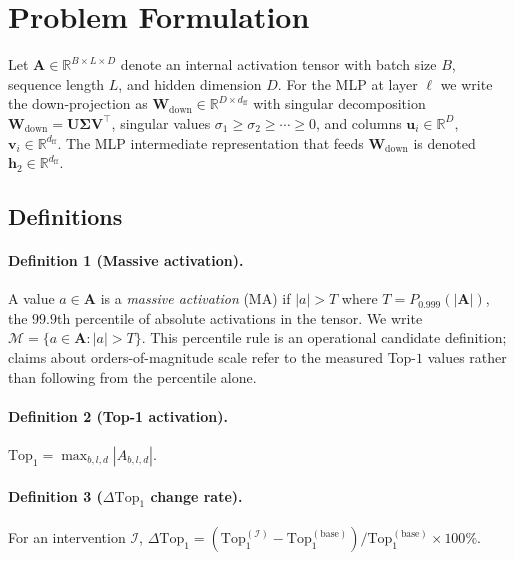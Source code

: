 \documentclass{article}
\newcommand{\Wdown}{\mathbf{W}_{\text{down}}}
\newcommand{\ffd}{d_{\text{ff}}}
\newcommand{\topk}{\mathrm{Top}}
\begin{document}
\section{Problem Formulation}
\label{sec:prelim}

Let $\mathbf{A} \in \mathbb{R}^{B \times L \times D}$ denote an internal
activation tensor with batch size $B$, sequence length $L$, and hidden
dimension $D$. For the MLP at layer $\ell$ we write the down-projection as
$\Wdown \in \mathbb{R}^{D \times \ffd}$ with singular decomposition
$\Wdown = \mathbf{U}\boldsymbol{\Sigma}\mathbf{V}^{\top}$, singular values
$\sigma_1 \geq \sigma_2 \geq \cdots \geq 0$, and columns
$\mathbf{u}_i \in \mathbb{R}^D$, $\mathbf{v}_i \in \mathbb{R}^{\ffd}$. The
MLP intermediate representation that feeds $\Wdown$ is denoted
$\mathbf{h}_2 \in \mathbb{R}^{\ffd}$.

\subsection{Definitions}
\label{sec:defs}

\paragraph{Definition 1 (Massive activation).}
A value $a \in \mathbf{A}$ is a \emph{massive activation} (MA) if $|a| > T$
where $T = P_{0.999}(|\mathbf{A}|)$, the $99.9$th percentile of absolute
activations in the tensor. We write
$\mathcal{M} = \{a \in \mathbf{A} : |a| > T\}$. This percentile rule is an
operational candidate definition; claims about orders-of-magnitude scale refer
to the measured Top-$1$ values rather than following from the percentile alone.

\paragraph{Definition 2 (Top-1 activation).}
$\topk_1 = \max_{b,l,d} |A_{b,l,d}|$.

\paragraph{Definition 3 ($\Delta\topk_1$ change rate).}
For an intervention $\mathcal{I}$,
$\Delta\topk_1 = (\topk_1^{(\mathcal{I})} - \topk_1^{(\text{base})}) / \topk_1^{(\text{base})} \times 100\%$.
\end{document}
